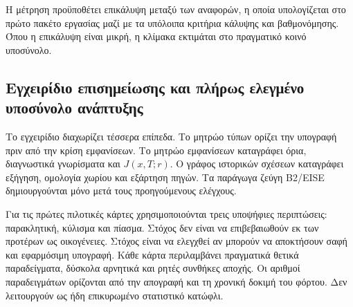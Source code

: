 \documentclass[11pt,a4paper]{article}
\begin{document}
Η μέτρηση προϋποθέτει επικάλυψη μεταξύ των αναφορών, η οποία υπολογίζεται στο πρώτο πακέτο εργασίας μαζί με τα υπόλοιπα κριτήρια κάλυψης και βαθμονόμησης. Όπου η επικάλυψη είναι μικρή, η κλίμακα εκτιμάται στο πραγματικό κοινό υποσύνολο.

\subsection{Εγχειρίδιο επισημείωσης και πλήρως ελεγμένο υποσύνολο ανάπτυξης}\label{app:corpora-annotation-pilot}

Το εγχειρίδιο διαχωρίζει τέσσερα επίπεδα. Το μητρώο τύπων ορίζει την υπογραφή πριν από την κρίση εμφανίσεων. Το μητρώο εμφανίσεων καταγράφει όρια, διαγνωστικά γνωρίσματα και $J(x,T;r)$. Ο γράφος ιστορικών σχέσεων καταγράφει εξήγηση, ομολογία χωρίου και εξάρτηση πηγών. Τα παράγωγα ζεύγη B2/EISE δημιουργούνται μόνο μετά τους προηγούμενους ελέγχους.

Για τις πρώτες πιλοτικές κάρτες χρησιμοποιούνται τρεις υποψήφιες περιπτώσεις: παρακλητική, κύλισμα και πίασμα. Στόχος δεν είναι να επιβεβαιωθούν εκ των προτέρων ως οικογένειες. Στόχος είναι να ελεγχθεί αν μπορούν να αποκτήσουν σαφή και εφαρμόσιμη υπογραφή. Κάθε κάρτα περιλαμβάνει πραγματικά θετικά παραδείγματα, δύσκολα αρνητικά και ρητές συνθήκες αποχής. Οι αριθμοί παραδειγμάτων ορίζονται από την απογραφή και τη χρονική δοκιμή του φόρτου. Δεν λειτουργούν ως ήδη επικυρωμένο στατιστικό κατώφλι.
\end{document}
